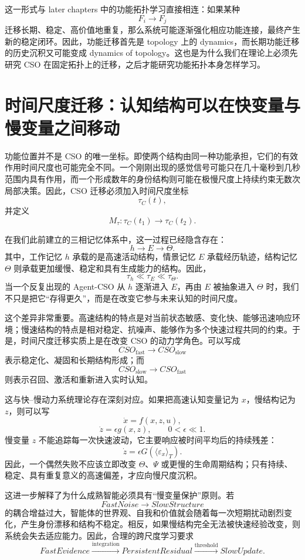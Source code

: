 这一形式与 later chapters 中的功能拓扑学习直接相连：如果某种
\[
F_i\rightarrow F_j
\]
迁移长期、稳定、高价值地重复，那么系统可能逐渐强化相应功能连接，最终产生新的稳定闭环。因此，功能迁移首先是 topology 上的 dynamics，而长期功能迁移的历史沉积又可能变成 dynamics of topology。这也是为什么我们在理论上必须先研究 CSO 在固定拓扑上的迁移，之后才能研究功能拓扑本身怎样学习。


\section{时间尺度迁移：认知结构可以在快变量与慢变量之间移动}

功能位置并不是 CSO 的唯一坐标。即使两个结构由同一种功能承担，它们的有效作用时间尺度也可能完全不同。一个刚刚出现的感觉信号可能只在几十毫秒到几秒范围内具有作用，而一个形成数年的身份结构则可能在极慢尺度上持续约束无数次局部决策。因此，CSO 迁移必须加入时间尺度坐标
\[
\tau_C(t),
\]
并定义
\[
M_\tau:
\tau_C(t_1)
\longrightarrow
\tau_C(t_2).
\]

在我们此前建立的三相记忆体系中，这一过程已经隐含存在：
\[
h
\rightarrow
E
\rightarrow
\Theta.
\]
其中，工作记忆 $h$ 承载的是高速活动结构，情景记忆 $E$ 承载经历轨迹，结构记忆 $\Theta$ 则承载更加缓慢、稳定和具有生成能力的结构。因此，
\[
\tau_h
\ll
\tau_E
\ll
\tau_\Theta.
\]
当一个反复出现的 Agent-CSO 从 $h$ 逐渐进入 $E$，再由 $E$ 被抽象进入 $\Theta$ 时，我们不只是把它“存得更久”，而是在改变它参与未来认知的时间尺度。

这个差异非常重要。高速结构的特点是对当前状态敏感、变化快、能够迅速响应环境；慢速结构的特点是相对稳定、抗噪声、能够作为多个快速过程共同的约束。于是，时间尺度迁移实质上是在改变 CSO 的动力学角色。可以写成
\[
CSO_{\mathrm{fast}}
\rightarrow
CSO_{\mathrm{slow}}
\]
表示稳定化、凝固和长期结构形成；而
\[
CSO_{\mathrm{slow}}
\rightarrow
CSO_{\mathrm{fast}}
\]
则表示召回、激活和重新进入实时认知。

这与快--慢动力系统理论存在深刻对应。如果把高速认知变量记为 $x$，慢结构记为 $z$，则可以写
\[
\dot x
=
f(x,z,u),
\]
\[
\dot z
=
\epsilon g(x,z),
\qquad
0<\epsilon\ll1.
\]
慢变量 $z$ 不能追踪每一次快速波动，它主要响应被时间平均后的持续残差：
\[
\dot z
=
\epsilon
G\left(
\langle \varepsilon_x\rangle_T
\right).
\]
因此，一个偶然失败不应该立即改变 $\Theta$、$\Psi$ 或更慢的生命周期结构；只有持续、稳定、具有重复意义的高速偏差，才应向慢尺度沉积。

这进一步解释了为什么成熟智能必须具有“慢变量保护”原则。若
\[
FastNoise
\rightarrow
SlowStructure
\]
的耦合增益过大，智能体的世界观、自我和价值就会随着每一次短期扰动剧烈变化，产生身份漂移和结构不稳定。相反，如果慢结构完全无法被快速经验改变，则系统会失去适应能力。因此，合理的跨尺度学习要求
\[
FastEvidence
\xrightarrow{\text{integration}}
PersistentResidual
\xrightarrow{\text{threshold}}
SlowUpdate.
\]

